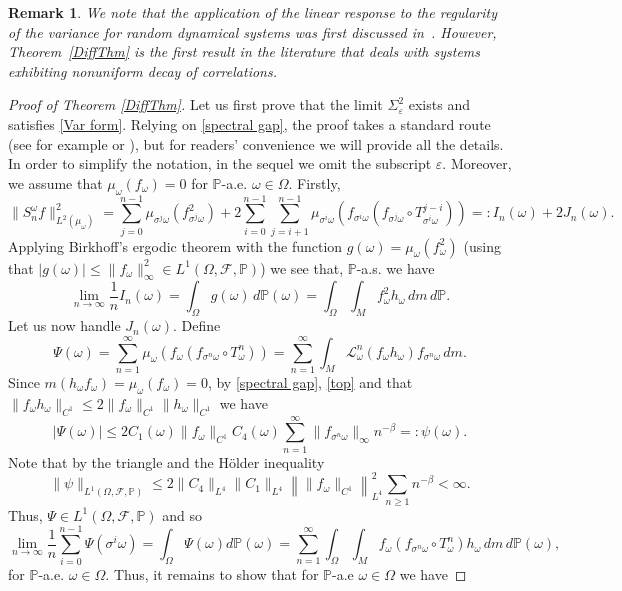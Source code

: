 \documentclass[11pt,reqno,a4paper]{article}
\theoremstyle{special}
\newtheorem{remark}[theorem]{Remark}
\def\om{\omega}
\begin{document}
\begin{remark}
We note that the application of the linear response to the regularity of the variance for random dynamical systems was first discussed in~\cite[Theorem 17]{DS}. However,  Theorem~\ref{DiffThm} is the first result in the literature that deals with systems exhibiting nonuniform decay of correlations. 
\end{remark}



\begin{proof}[Proof of Theorem \ref{DiffThm}]
Let us first prove that the limit $\Sigma_\varepsilon^2$ exists and satisfies \eqref{Var form}. Relying on \eqref{spectral gap}, the proof takes a standard route (see for example \cite[Theorem 2.3]{Kifer 1998} or \cite[Lemma 12]{Nonlin}), but for readers' convenience  we will provide all the details. In order to simplify the notation, in the sequel  we omit the subscript $\varepsilon$. Moreover, we assume that $\mu_\om(f_\om)=0$ for $\mathbb P$-a.e. $\om \in \Omega$.
Firstly,
$$
\|S_n^\om f\|_{L^2(\mu_\om)}^2=\sum_{j=0}^{n-1}\mu_{\sigma^j\om}(f_{\sigma^j\om}^2)+2\sum_{i=0}^{n-1} \sum_{j=i+1}^{n-1}\mu_{\sigma^i\om}(f_{\sigma^i\om}(f_{\sigma^j\om}\circ T_{\sigma^i\om}^{j-i}))=:I_n(\om)+2J_n(\om).
$$
Applying  Birkhoff's ergodic theorem with the function $g(\om)=\mu_{\om}(f_{\om}^2)$ (using that $|g(\om)|\leq \|f_\om\|_\infty^2\in L^1(\Omega,\mathcal F,\mathbb P)$) we see that, $\mathbb P$-a.s. we have 
$$
\lim_{n\to\infty}\frac1n I_n(\om)=\int_\Omega g(\om) \, d\mathbb P(\om)=\int_\Omega \int_M f_{\om}^2h_{\om}\, dm\, d\mathbb P.
$$
Let us now handle $J_n(\om)$. Define 
$$
\Psi(\om)=\sum_{n=1}^\infty \mu_\om( f_\om  (f_{\sigma^n\om}\circ T_\om^n))=\sum_{n=1}^\infty\int_{M}\mathcal L_\om^n(f_\om h_\om)f_{\sigma^n\om}\, d m.
$$
Since $m(h_\om f_\om)=\mu_\om(f_\om)=0$, by \eqref{spectral gap}, \eqref{top} and that $\|f_\om h_\om\|_{C^1} \le 2\|f_\om\|_{C^1}\|h_\om\|_{C^1}$
we have  
$$
|\Psi(\om)|\leq 2C_1(\om)\|f_\om\|_{C^1}C_4(\om)\sum_{n=1}^\infty \|f_{\sigma^n\om}\|_\infty n^{-\beta}=:\psi(\om).
$$
Note that by the triangle and the  H\"older inequality
$$
\|\psi\|_{L^1(\Omega,\mathcal F,\mathbb P)}\leq 2\|C_4\|_{L^4}\|C_1\|_{L^4}\left\|\|f_\om\|_{C^1}\right\|_{L^4}^2\sum_{n\geq 1}n^{-\beta}<\infty. 
$$
Thus, $\Psi\in L^1(\Omega,\mathcal F,\mathbb P)$ and so 
$$
\lim_{n\to\infty}\frac1n\sum_{i=0}^{n-1}\Psi(\sigma^i\om)=\int_{\Omega}\Psi(\om)d\mathbb 
 P(\om)=\sum_{n=1}^\infty \int_\Omega\int_M f_{\om} (f_{\sigma^n \omega}\circ T_{\om}^n)h_{\om}\, dm \, d\mathbb P(\om),
$$
for $\mathbb P$-a.e. $\om \in \Omega$. Thus, it remains to show that for $\mathbb P$-a.e $\om \in \Omega$ we have

\end{proof}
\end{document}
